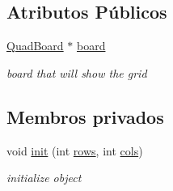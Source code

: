 \subsection*{Atributos Públicos}
\begin{DoxyCompactItemize}
\item 
\hyperlink{classQuadBoard}{Quad\+Board} $\ast$ \hyperlink{classLife_a8a6ccc5c3099a9007d7b2ec22402e6cb}{board}
\begin{DoxyCompactList}\small\item\em board that will show the grid \end{DoxyCompactList}\end{DoxyCompactItemize}
\subsection*{Membros privados}
\begin{DoxyCompactItemize}
\item 
void \hyperlink{classLife_a8598dfc9e71062fc3e7345a2a86015cc}{init} (int \hyperlink{classLife_ab4d1ea4344ba31a4686f388edb7e2927}{rows}, int \hyperlink{classLife_a31a428734f7dc76ca386963139699ac6}{cols})
\begin{DoxyCompactList}\small\item\em initialize object \end{DoxyCompactList}\end{DoxyCompactItemize}
